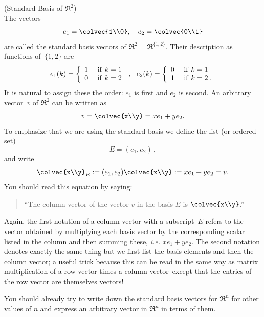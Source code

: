 \begin{example} (Standard Basis of $\Re^2$)\\
The vectors 
$$
e_1=\colvec{1\\0},~~~
e_2=\colvec{0\\1}
$$
are called the standard basis vectors of $\Re^2=\Re^{\{1,2\}}$. 
Their description as functions of~$\{1,2\}$ are 
\begin{displaymath}
   e_1 (k)= \left\{
     \begin{array}{lr}
       1 & {\rm ~if~} k=1\\
       0 & {\rm ~if~} k=2
     \end{array}
   \right. \, ,~~
   e_2 (k)= \left\{
     \begin{array}{ll}
       0 & {\rm ~if~} k=1\\
       1 & {\rm ~if~} k=2\, .
     \end{array}
   \right.
\end{displaymath} 
It is  natural to assign these  the order: $e_1$ is first and $e_2$ is second.
An arbitrary vector~$v$ of $\Re^2$ can be written as  
$$
v=\colvec{x\\y}=x e_1+ ye_2 .
$$
To emphasize that we are using the standard basis we define the list (or ordered set) $$E=(e_1,e_2)\, ,$$ and write 
$$
\colvec{x\\y}_E:=(e_1,e_2)\colvec{x\\y}:=x e_1+ ye_2=v .
$$
You should read this equation by saying:
\begin{quote}
``The column vector of the vector $v$ in the basis $E$ is $\colvec{x\\y}$.''
\end{quote}

Again, the first notation of a column vector with a subscript~$E$ refers to the vector obtained by multiplying each basis vector
by the corresponding scalar listed in the column and then  summing these, {\it i.e.} $xe_1+y e_2$. 
The second notation denotes exactly the same thing but we first list the basis elements and then the column vector; a useful trick
because this can be read in the same way as matrix multiplication of a row vector times a column vector--except that the entries of the row vector are themselves vectors! 
\end{example}

You should already try to write down the standard basis vectors for $\Re^n$ for other values of $n$ and express an arbitrary vector in $\Re^n$  in terms of them.%

